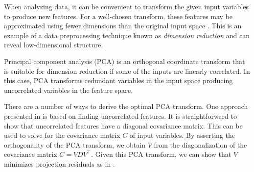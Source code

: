 


When analyzing data, it can be convenient to transform the given input variables to produce new features.
For a well-chosen transform, these features may be approximated using fewer dimensions than the original input space \cite{koutroumbas2008pattern}.
This is an example of a data preprocessing technique known as \textit{dimension reduction} and can reveal low-dimensional structure.

Principal component analysis (PCA) is an orthogonal coordinate transform that is suitable for dimension reduction if some of the inputs are linearly correlated.
In this case, PCA transforms redundant variables in the input space producing uncorrelated variables in the feature space.

There are a number of ways to derive the optimal PCA transform.
One approach presented in \cite{koutroumbas2008pattern} is based on finding uncorrelated features.
It is straightforward to show that uncorrelated features have a diagonal covariance matrix.
This can be used to solve for the covariance matrix \(C\) of input variables.
By asserting the orthogonality of the PCA transform, we obtain \(V\) from the diagonalization of the covariance matrix \(C = VDV^\top\).
Given this PCA transform, we can show that \(V\) minimizes projection residuals as in \cite{shalizi2021advanced}.

